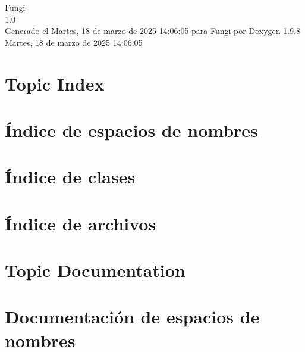 \documentclass[twoside]{book}
\newcommand{\+}{\discretionary{\mbox{\scriptsize$\hookleftarrow$}}{}{}}
\newcommand{\clearemptydoublepage}{%
    \newpage{\pagestyle{empty}\cleardoublepage}%
  }
\begin{document}
  \raggedbottom
    \hypersetup{pageanchor=false,
                bookmarksnumbered=true,
                pdfencoding=unicode
               }
  \begin{titlepage}
  \vspace*{7cm}
  \begin{center}%
  {\Large Fungi}\\
  [1ex]\large 1.\+0 \\
  \vspace*{1cm}
  {\large Generado el Martes, 18 de marzo de 2025 14\+:06\+:05 para Fungi por Doxygen 1.9.8}\\
    \vspace*{0.5cm}
    {\small Martes, 18 de marzo de 2025 14:06:05}
  \end{center}
  \end{titlepage}
  \clearemptydoublepage
  \tableofcontents
  \clearemptydoublepage
  \hypersetup{pageanchor=true}

\chapter{Topic Index}

\chapter{Índice de espacios de nombres}

\chapter{Índice de clases}

\chapter{Índice de archivos}

\chapter{Topic Documentation}

\chapter{Documentación de espacios de nombres}




\end{document}
